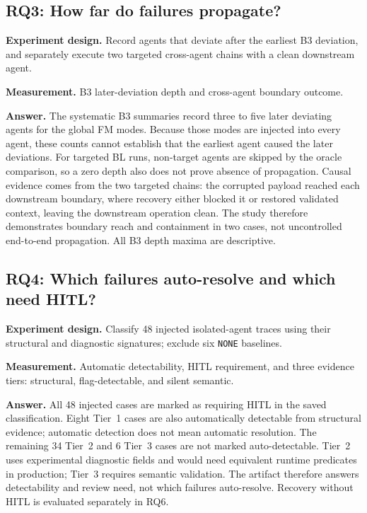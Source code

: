 \documentclass[sigconf,review,anonymous,balance=false]{acmart}
\begin{document}
\subsection{RQ3: How far do failures propagate?}

\textbf{Experiment design.} Record agents that deviate after the earliest B3
deviation, and separately execute two targeted cross-agent chains with a clean
downstream agent.

\textbf{Measurement.} B3 later-deviation depth and cross-agent boundary outcome.

\textbf{Answer.} The systematic B3 summaries record three to five later
deviating agents for the global FM modes. Because those modes are injected into
every agent, these counts cannot establish that the earliest agent caused the
later deviations. For targeted BL runs, non-target agents are skipped by the
oracle comparison, so a zero depth also does not prove absence of propagation.
Causal evidence comes from the two targeted chains: the corrupted payload
reached each downstream boundary, where recovery either blocked it or restored
validated context, leaving the downstream operation clean. The study therefore
demonstrates boundary reach and containment in two cases, not uncontrolled
end-to-end propagation. All B3 depth maxima are descriptive.

\subsection{RQ4: Which failures auto-resolve and which need HITL?}

\textbf{Experiment design.} Classify 48 injected isolated-agent traces using
their structural and diagnostic signatures; exclude six \texttt{NONE}
baselines.

\textbf{Measurement.} Automatic detectability, HITL requirement, and three
evidence tiers: structural, flag-detectable, and silent semantic.

\textbf{Answer.} All 48 injected cases are marked as requiring HITL in the saved
classification. Eight Tier~1 cases are also automatically detectable from
structural evidence; automatic detection does not mean automatic resolution.
The remaining 34 Tier~2 and 6 Tier~3 cases are not marked auto-detectable.
Tier~2 uses experimental diagnostic fields and would need equivalent runtime
predicates in production; Tier~3 requires semantic validation. The artifact
therefore answers detectability and review need, not which failures
auto-resolve. Recovery without HITL is evaluated separately in RQ6.
\end{document}
